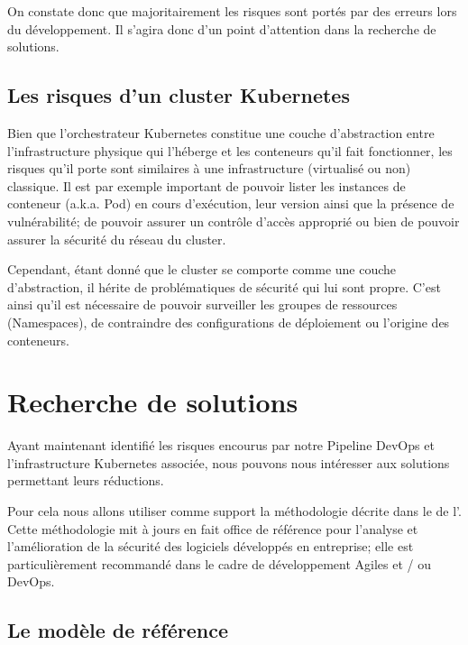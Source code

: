 On constate donc que majoritairement les risques sont portés par des erreurs lors du développement.
Il s'agira donc d'un point d'attention dans la recherche de solutions.

\subsection{Les risques d'un cluster Kubernetes}

Bien que l'orchestrateur Kubernetes constitue une couche d'abstraction entre l'infrastructure physique qui 
l'héberge et les conteneurs qu'il fait fonctionner, les risques qu'il porte sont similaires à une infrastructure
(virtualisé ou non) classique. Il est par exemple important de pouvoir lister les instances de conteneur (a.k.a. 
Pod) en cours d'exécution, leur version ainsi que la présence de vulnérabilité; de pouvoir assurer un contrôle
d'accès approprié ou bien de pouvoir assurer la sécurité du réseau du cluster. 

Cependant, étant donné que le cluster se comporte comme une couche d'abstraction, il hérite de problématiques
de sécurité qui lui sont propre. C'est ainsi qu'il est nécessaire de pouvoir surveiller les groupes de ressources
(Namespaces), de contraindre des configurations de déploiement ou l'origine des conteneurs.

\newpage

\section{Recherche de solutions}

Ayant maintenant identifié les risques encourus par notre Pipeline DevOps et l'infrastructure Kubernetes associée,
nous pouvons nous intéresser aux solutions permettant leurs réductions.

Pour cela nous allons utiliser comme support la méthodologie décrite dans le 
\autocite{samm_v2.0_owasp_project_2021}
de l'\citeauthor{samm_v2.0_owasp_project_2021}. Cette méthodologie mit à jours en 
fait office de référence pour l'analyse et l'amélioration de la sécurité des logiciels développés en entreprise; elle est
particulièrement recommandé dans le cadre de développement Agiles et / ou DevOps.

\subsection{Le modèle de référence}

